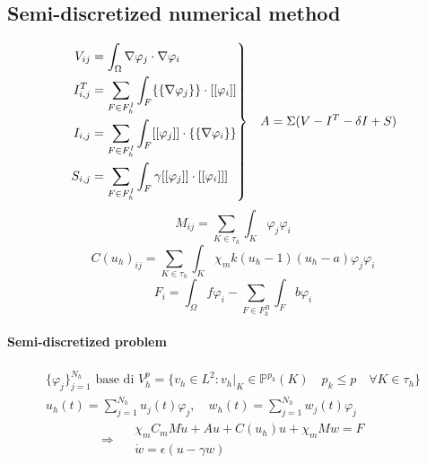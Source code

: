 \documentclass[a4paper]{article}
\newenvironment{rcases}
{\left.\begin{aligned}}
	{\end{aligned}\right\rbrace}
\begin{document}
\vspace{5mm}

\subsection{Semi-discretized numerical method}

	\vspace{5mm}
	 \begin{equation}
	 \begin{rcases}
	 V_{ij} &= \int_{\Omega}\nabla\varphi_j \cdot \nabla \varphi_i 
	 \\ I_{i,j}^T &= \sum_{F \in F_h^I} \int_{F} \{\{\nabla\varphi_j\}\} \cdot [[\varphi_i]] 
	\\ I_{i,j} &= \sum_{F \in F_h^I} \int_{F} [[\varphi_j]] \cdot \{\{\nabla \varphi_i\}\}
	 \\S_{i,j} &= \sum_{F \in F_h^I} \int_{F} \gamma [[\varphi_j]] \cdot [[\varphi_i]]]
	 \end{rcases}
	 \quad A = \Sigma(V -I^T - \delta I + S)
	\end{equation}
	\begin{equation}
	M_{ij} = \sum_{K \in \tau_h}\int_K
	\varphi_j\varphi_i
	\end{equation}
	\begin{equation}
	C(u_h)_{ij} =  \sum_{K \in \tau_h} \int_K \chi_m k(u_h-1)(u_h-a)\varphi_j\varphi_i
	\end{equation}
	\begin{equation}
	F_i = \int_{\Omega} f\varphi_i - \sum_{F \in F_h^B} \int_F b\varphi_i
	\end{equation}
	
	\vspace{3mm}
\paragraph{Semi-discretized problem} 

\begin{equation*}
\begin{gathered}
\{\varphi_j\}_{j=1}^{N_h} \text{ base di } V_h^p = \{v_h \in L^2 : v_h|_K \in \mathbb{P}^{p_k}(K) \quad p_k \leq p \quad \forall K \in \tau_h \}
\\
u_h(t) = \sum_{j=1}^{N_h} u_j(t)\varphi_j, \quad w_h(t) = \sum_{j=1}^{N_h}w_j(t)\varphi_j
\end{gathered}
\end{equation*}
\vspace{3mm}
\begin{equation}
\Rightarrow \quad  \begin{gathered}\boxed{\chi_mC_m M \dot{u} +  A u + C(u_h) u +\chi_mMw=F}
	\\
	\boxed{\dot{w} = \epsilon(u-\gamma w)}
	\end{gathered}
\end{equation}
\vspace{5mm}
\end{document}
